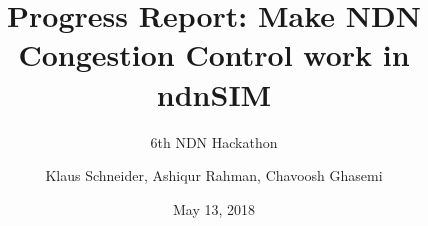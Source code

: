 \documentclass[12pt,nonotes]{beamer}
\author{\footnotesize Klaus Schneider, Ashiqur Rahman, Chavoosh Ghasemi}
\title{Progress Report: Make NDN Congestion Control work in ndnSIM}
\subtitle{6th NDN Hackathon}
\date{May 13, 2018}
\institute{The University of Arizona}
\begin{document}
\frame{\titlepage}



%

%	
\end{document}
